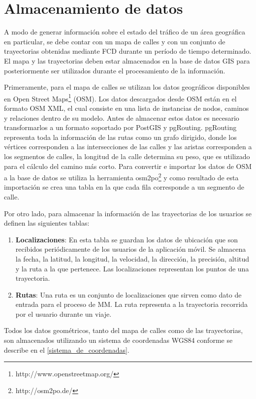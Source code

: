 \section{Almacenamiento de datos}
\label{base-de-datos}

A modo de generar información sobre el estado del tráfico de un área geográfica en particular, se debe contar con un mapa de calles y con un conjunto de trayectorias obtenidas mediante FCD durante un período de tiempo determinado. El mapa y las trayectorias deben estar almacenados en la base de datos GIS para posteriormente ser utilizados durante el procesamiento de la información.

Primeramente, para el mapa de calles se utilizan los datos geográficos disponibles en Open Street Maps\footnote{http://www.openstreetmap.org/} (OSM). Los datos descargados desde OSM están en el formato OSM XML, el cual consiste en una lista de instancias de nodos, caminos y relaciones dentro de su modelo. Antes de almacenar estos datos es necesario transformarlos a un formato soportado por PostGIS y pgRouting. pgRouting representa toda la información de las rutas como un grafo dirigido, donde los vértices corresponden a las intersecciones de las calles y las aristas corresponden a los segmentos de calles, la longitud de la calle determina su peso, que es utilizado para el cálculo del camino más corto. Para convertir e importar los datos de OSM a la base de datos se utiliza la herramienta osm2po\footnote{http://osm2po.de/} y como resultado de esta importación se crea una tabla en la que cada fila corresponde a un segmento de calle. 

Por otro lado, para almacenar la información de las trayectorias de los usuarios se definen las siguientes tablas:
\begin{enumerate}
\item \textbf{Localizaciones}: En esta tabla se guardan los datos de ubicación que son recibidos periódicamente de los usuarios de la aplicación móvil. Se almacena la fecha, la latitud, la longitud, la velocidad, la dirección, la precisión, altitud y la ruta a la que pertenece. Las localizaciones representan los puntos de una trayectoria.
\item \textbf{Rutas}: Una ruta es un conjunto de localizaciones que sirven como dato de entrada para el proceso de MM. La ruta representa a la trayectoria recorrida por el usuario durante un viaje.
\end{enumerate}

Todos los datos geométricos, tanto del mapa de calles como de las trayectorias, son almacenados utilizando un sistema de coordenadas WGS84 conforme se describe en el \cref{sistema_de_coordenadas}.

